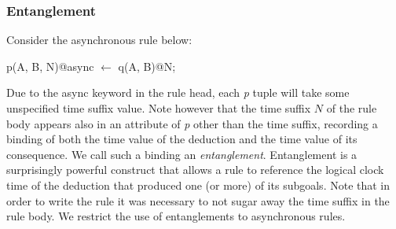 








\subsubsection{Entanglement}

Consider the asynchronous rule below:

\begin{Dedalus}
p(A, B, N)@async \(\leftarrow\)
  q(A, B)@N;
\end{Dedalus}

Due to the async keyword in the rule head, each \emph{p} tuple will take some unspecified time suffix value.
Note however that the time suffix $N$ of the rule body appears also in an attribute of \emph{p} other than the time suffix, recording a 
binding of both the time value of the deduction and the time value of its consequence.  We call such a binding
an \emph{entanglement}.   Entanglement is a surprisingly powerful construct that allows a rule to 
reference the logical clock time of the deduction that produced one (or more) of its subgoals.  Note that in order
to write the rule it was necessary to not sugar away the time suffix in the rule body.  We restrict the use of entanglements to asynchronous rules. 

